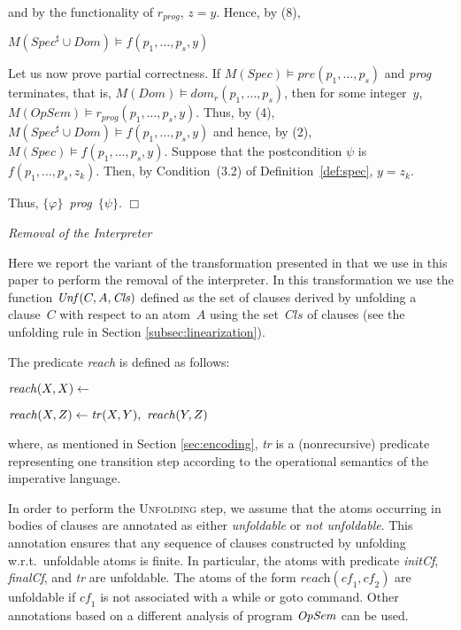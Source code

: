 \documentclass[english]{tlp}
\begin{document}
\smallskip
\noindent
and
by the functionality of $ r_{\textit{prog}}$, $z=y$. Hence, by (8),

\smallskip
$M(\textit{Spec}^{\sharp}\cup \textit{Dom})\models f(p_1,\ldots,p_s,y) $

\medskip
\noindent
Let us now prove partial correctness.
If $M(\textit{Spec}) \models {\textit{pre}}(p_1,\ldots,p_s)$  and 
\textit{prog} terminates, that is, $M(\textit{Dom}) \models \textit{dom}_r(p_1,\ldots,p_s)$,  
then for some integer~$y$, $M(\textit{OpSem}) \models  r_{\textit{prog}}(p_1,\ldots,p_s,y)$.
Thus, by (4),  $M(\textit{Spec}^\sharp \cup \textit{Dom}) \models  f(p_1,\ldots,p_s,y)$
and hence, by (2), $M(\textit{Spec}) \models  f(p_1,\ldots,p_s,y)$.
Suppose that  the postcondition $\psi$ is $f(p_1,\ldots,p_s,z_k)$. Then,
by {Condition~(3.2)} of Definition~\ref{def:spec}, $y=z_k$.

Thus, \mbox{$\{\varphi\} $ {\textit{prog}} $\{\psi\}$}.
\hfill $\Box$



\bigskip

\noindent
{\it Removal of the Interpreter}


\noindent
Here we report the variant of the transformation presented in \cite{De&14c} that
we use in this paper to perform the removal of the interpreter. 
In this transformation we use the function $\textit{Unf\/}(C,A,{\it Cls})$ 
defined as the set of clauses derived by unfolding a clause~$C$ with respect to an atom~$A$
using the set~$\textit{Cls}$ of clauses (see the unfolding rule in Section \ref{subsec:linearization}).

The predicate {\it reach} is defined as follows:

${\it reach}(X,X) \leftarrow$

${\it reach}(X,Z) \leftarrow {\it tr}(X,Y),\ {\it reach}(Y,Z)$

\noindent
where, as mentioned in Section \ref{sec:encoding}, {\it tr} is a (nonrecursive) predicate representing 
one transition step according to the operational semantics of the imperative language.

In order to perform the \textsc{Unfolding} step,
we assume that the atoms occurring in bodies of clauses 
are annotated as either {\em unfoldable} 
or {\em not unfoldable}. 
This annotation 
ensures that any sequence of clauses constructed by unfolding
w.r.t.~unfoldable atoms is finite. 
In particular, the atoms with predicate \textit{initCf\/}, \textit{finalCf\/},
and {\it tr\/} are unfoldable. The atoms of the form 
$\textit{reach}(\textit{cf}_1,\textit{cf}_2)$ are unfoldable if $\textit{cf}_1$
is not associated with a while or goto command. 
Other annotations based on a different analysis of program ${\it OpSem}$ can be used.
\end{document}

